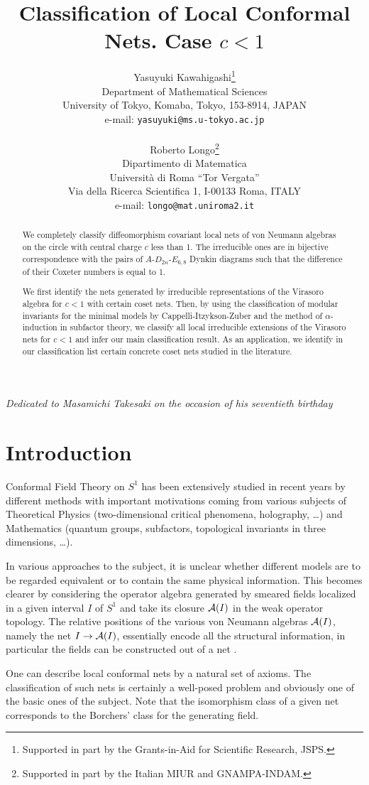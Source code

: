 \documentclass[12pt]{article}
\title{{\bf Classification of Local Conformal Nets. Case $c<1$}}
\author{
{\sc Yasuyuki Kawahigashi}\footnote{Supported in part by the
Grants-in-Aid for Scientific Research, JSPS.}\\
Department of Mathematical Sciences\\
University of Tokyo, Komaba, Tokyo, 153-8914, JAPAN\\
e-mail: {\tt yasuyuki@ms.u-tokyo.ac.jp}\\
\vphantom{X}\\
{\sc Roberto Longo}\footnote{Supported in part by the Italian MIUR and 
GNAMPA-INDAM.}\\
Dipartimento di Matematica\\
Universit\`a di Roma ``Tor Vergata''\\
Via della Ricerca Scientifica 1, I-00133 Roma, ITALY\\
e-mail: {\tt longo@mat.uniroma2.it}}
\def\A{{\cal A}}
\begin{document}
\date{}
\maketitle
\centerline{\sl Dedicated to Masamichi Takesaki on the occasion of his
seventieth birthday}

\begin{abstract}
We completely classify diffeomorphism covariant local nets of von 
Neumann algebras on the circle with central charge $c$ less than 1.  
The irreducible ones are in bijective correspondence with the pairs of
$A$-$D_{2n}$-$E_{6,8}$ Dynkin diagrams such that 
the difference of their Coxeter numbers is equal to 1.

We first identify the nets generated by irreducible representations of 
the Virasoro algebra for $c<1$ with certain coset nets.  Then, by 
using the classification of modular invariants for the minimal models 
by Cappelli-Itzykson-Zuber and the method of $\alpha$-induction in 
subfactor theory, we classify all local irreducible extensions of the 
Virasoro nets for $c<1$ and infer our main classification result.  
As an application, we identify in our classification list 
certain concrete coset nets studied in the literature.
\end{abstract}
\newpage

\section{Introduction}
\label{intro}
Conformal Field Theory on $S^1$ has been extensively studied in 
recent years by different methods with important motivations coming 
from various subjects of Theoretical Physics (two-dimensional critical 
phenomena, holography, \dots) and Mathematics 
(quantum groups, subfactors, topological invariants in three
dimensions, \dots).

In various approaches to the subject, it is unclear whether different 
models are to be regarded equivalent or to contain the same physical 
information.
This becomes clearer by considering the operator algebra generated 
by smeared fields
localized in a given interval $I$ of $S^1$ and take its closure 
$\A(I)$ in the weak operator topology. The relative positions of the 
various von Neumann algebras $\A(I)$,
namely the net $I\to\A(I)$, essentially encode all the structural 
information, in particular the fields can be constructed out 
of a net \cite{FJ}. 

One can describe local conformal nets by a natural set of axioms. 
The classification of such nets is certainly a well-posed problem and obviously
one of the basic ones of the subject. Note that the isomorphism class 
of a given net corresponds to the Borchers' class for the generating 
field.
\end{document}

